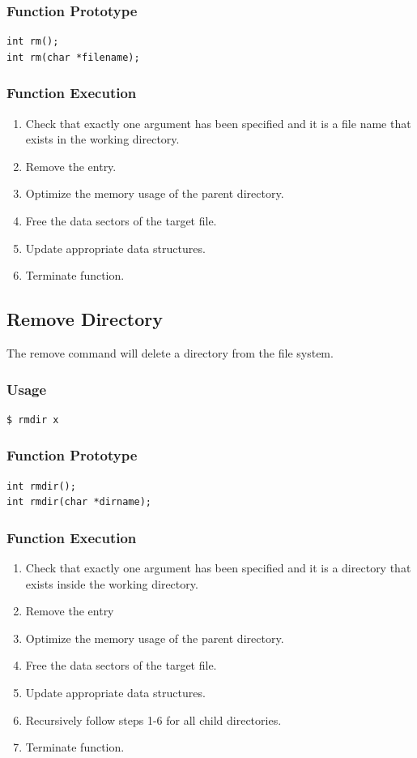 \documentclass[12pt,letterpaper]{article}
\begin{document}
\subsubsection{Function Prototype}
\begin{verbatim}
int rm();
int rm(char *filename);
\end{verbatim}
\subsubsection{Function Execution}
\begin{enumerate}
\item Check that exactly one argument has been specified and it is a file name that exists in the working directory.
\item Remove the entry.
\item Optimize the memory usage of the parent directory.
\item Free the data sectors of the target file.
\item Update appropriate data structures.
\item Terminate function.
\end{enumerate}

\subsection{Remove Directory}
The remove command will delete a directory from the file system.
\subsubsection{Usage}
\begin{verbatim}
$ rmdir x
\end{verbatim}
\subsubsection{Function Prototype}
\begin{verbatim}
int rmdir();
int rmdir(char *dirname);
\end{verbatim}
\subsubsection{Function Execution}
\begin{enumerate}
\item Check that exactly one argument has been specified and it is a directory that exists inside the working directory.
\item Remove the entry
\item Optimize the memory usage of the parent directory.
\item Free the data sectors of the target file.
\item Update appropriate data structures.
\item Recursively follow steps 1-6 for all child directories.
\item Terminate function.
\end{enumerate}
\end{document}
